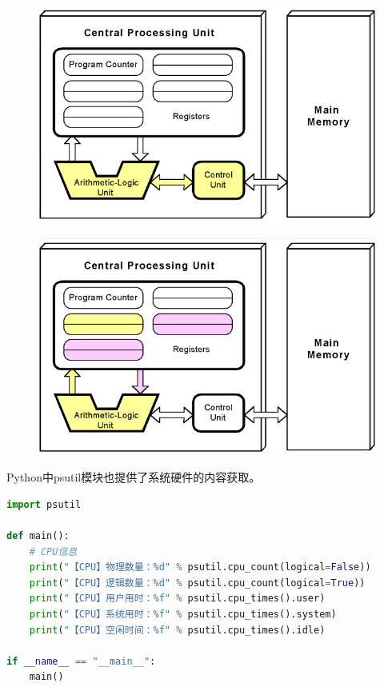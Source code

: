\begin{figure}[H]
	\centering
	\includegraphics[scale=0.5]{img/C1/1-3/2.png}
\end{figure}

\begin{figure}[H]
	\centering
	\includegraphics[scale=0.5]{img/C1/1-3/3.png}
\end{figure}

Python中psutil模块也提供了系统硬件的内容获取。\\


\begin{lstlisting}[language=Python]
import psutil

def main():
	# CPU信息
	print("【CPU】物理数量：%d" % psutil.cpu_count(logical=False))
	print("【CPU】逻辑数量：%d" % psutil.cpu_count(logical=True))
	print("【CPU】用户用时：%f" % psutil.cpu_times().user)
	print("【CPU】系统用时：%f" % psutil.cpu_times().system)
	print("【CPU】空闲时间：%f" % psutil.cpu_times().idle)

if __name__ == "__main__":
	main()
\end{lstlisting}


